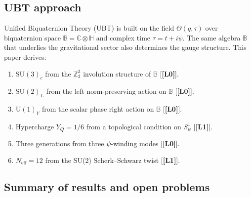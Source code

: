 \documentclass[12pt,a4paper]{article}
\theoremstyle{definition}
\theoremstyle{remark}
\newcommand{\SU}[1]{\mathrm{SU}(#1)}
\newcommand{\UU}[1]{\mathrm{U}(#1)}
\newcommand{\Bq}{\mathbb{C}\otimes\mathbb{H}}
\newcommand{\Lone}{\textbf{[L1]}}
\newcommand{\Lzero}{\textbf{[L0]}}
\begin{document}
\subsection{UBT approach}

Unified Biquaternion Theory (UBT) \cite{jaros2026gr} is built on the field
$\Theta(q,\tau)$ over biquaternion space $\mathbb{B} = \Bq$
and complex time $\tau = t + i\psi$.
The same algebra $\mathbb{B}$ that underlies the gravitational sector
also determines the gauge structure.
This paper derives:
\begin{enumerate}
\item $\SU{3}_c$ from the $\mathbb{Z}_2^3$ involution structure of $\mathbb{B}$ [\Lzero].
\item $\SU{2}_L$ from the left norm-preserving action on $\mathbb{B}$ [\Lzero].
\item $\UU{1}_Y$ from the scalar phase right action on $\mathbb{B}$ [\Lzero].
\item Hypercharge $Y_Q = 1/6$ from a topological condition on $S^1_\psi$ [\Lone].
\item Three generations from three $\psi$-winding modes [\Lzero].
\item $N_{\mathrm{eff}} = 12$ from the SU(2) Scherk--Schwarz twist [\Lone].
\end{enumerate}

\subsection{Summary of results and open problems}
\end{document}
